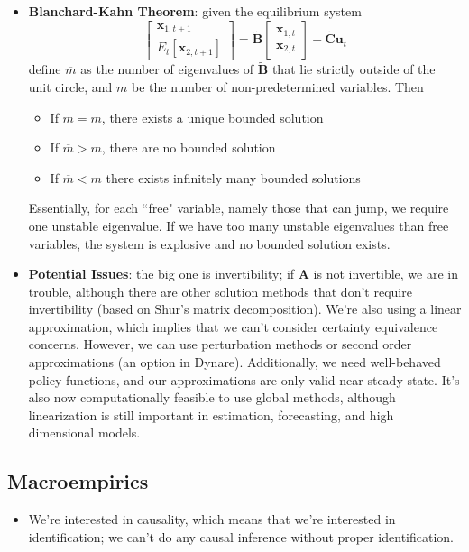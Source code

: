 \documentclass[12pt]{article}
\begin{document}
\begin{itemize}
    \item \textbf{Blanchard-Kahn Theorem}: given the equilibrium system 
    \[\begin{bmatrix}
        \textbf{x}_{1,t+1} \\
        E_t[\textbf{x}_{2,t+1}]
        \end{bmatrix} = \boldsymbol{\widetilde{B}}\begin{bmatrix}
        \textbf{x}_{1,t}\\
        \textbf{x}_{2,t}
        \end{bmatrix} + \boldsymbol{\widetilde{C}}\textbf{u}_t
    \]
    define $\overline{m}$ as the number of eigenvalues of $\boldsymbol{\widetilde{B}}$ that lie strictly outside of the unit circle, and $m$ be the number of non-predetermined variables. Then
    \begin{itemize}
        \item If $\overline{m} = m$, there exists a unique bounded solution
        \item If $\overline{m} > m$, there are no bounded solution
        \item If $\overline{m} < m$ there exists infinitely many bounded solutions
    \end{itemize}
    Essentially, for each ``free" variable, namely those that can jump, we require one unstable eigenvalue. If we have too many unstable eigenvalues than free variables, the system is explosive and no bounded solution exists.
    \item \textbf{Potential Issues}: the big one is invertibility; if $\textbf{A}$ is not invertible, we are in trouble, although there are other solution methods that don't require invertibility (based on Shur's matrix decomposition). We're also using a linear approximation, which implies that we can't consider certainty equivalence concerns. However, we can use perturbation methods or second order approximations (an option in Dynare). Additionally, we need well-behaved policy functions, and our approximations are only valid near steady state. It's also now computationally feasible to use global methods, although linearization is still important in estimation, forecasting, and high dimensional models.
\end{itemize}

\subsection{Macroempirics}

\begin{itemize}
    \item We're interested in causality, which means that we're interested in identification; we can't do any causal inference without proper identification.
\end{itemize}
\end{document}

